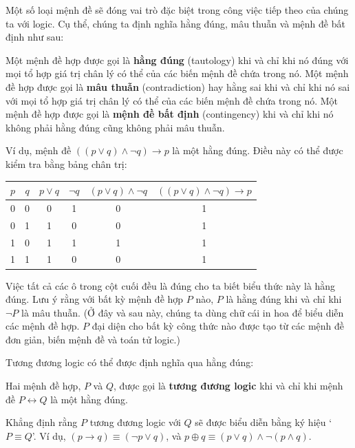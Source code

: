 Một số loại mệnh đề sẽ đóng vai trò đặc biệt trong công việc tiếp theo của chúng ta với logic. Cụ thể, chúng ta định nghĩa hằng đúng, mâu thuẫn và mệnh đề bất định như sau:

\begin{definition}
Một mệnh đề hợp được gọi là \textbf{hằng đúng} (tautology) khi và chỉ khi nó đúng với mọi tổ hợp giá trị chân lý có thể của các biến mệnh đề chứa trong nó. Một mệnh đề hợp được gọi là \textbf{mâu thuẫn} (contradiction) hay hằng sai khi và chỉ khi nó sai với mọi tổ hợp giá trị chân lý có thể của các biến mệnh đề chứa trong nó. Một mệnh đề hợp được gọi là \textbf{mệnh đề bất định} (contingency) khi và chỉ khi nó không phải hằng đúng cũng không phải mâu thuẫn.
\end{definition}

Ví dụ, mệnh đề $((p \lor q) \land \lnot q) \to p$ là một hằng đúng. Điều này có thể được kiểm tra bằng bảng chân trị:

\begin{center}
\begin{tabular}{cc|c|c|c|c}
\hline
$p$ & $q$ & $p \lor q$ & $\lnot q$ & $(p \lor q) \land \lnot q$ & $((p \lor q) \land \lnot q) \to p$ \\
\hline
0 & 0 & 0 & 1 & 0 & 1 \\
0 & 1 & 1 & 0 & 0 & 1 \\
1 & 0 & 1 & 1 & 1 & 1 \\
1 & 1 & 1 & 0 & 0 & 1 \\
\hline
\end{tabular}
\end{center}

Việc tất cả các ô trong cột cuối đều là đúng cho ta biết biểu thức này là hằng đúng. Lưu ý rằng với bất kỳ mệnh đề hợp $P$ nào, $P$ là hằng đúng khi và chỉ khi $\lnot P$ là mâu thuẫn. (Ở đây và sau này, chúng ta dùng chữ cái in hoa để biểu diễn các mệnh đề hợp. $P$ đại diện cho bất kỳ công thức nào được tạo từ các mệnh đề đơn giản, biến mệnh đề và toán tử logic.)

Tương đương logic có thể được định nghĩa qua hằng đúng:

\begin{definition}
Hai mệnh đề hợp, $P$ và $Q$, được gọi là \textbf{tương đương logic} khi và chỉ khi mệnh đề $P \leftrightarrow Q$ là một hằng đúng.
\end{definition}

Khẳng định rằng $P$ tương đương logic với $Q$ sẽ được biểu diễn bằng ký hiệu `$P \equiv Q$'. Ví dụ, $(p \to q) \equiv (\lnot p \lor q)$, và $p \oplus q \equiv (p \lor q) \land \lnot(p \land q)$.

